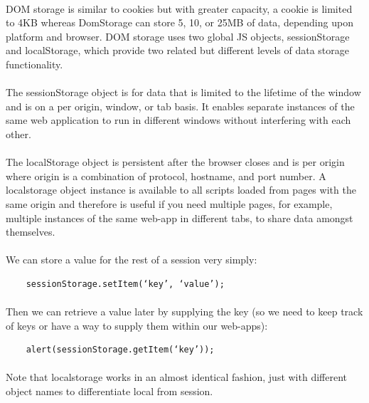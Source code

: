 \paragraph{} DOM storage is similar to cookies but with greater capacity, a cookie is limited to 4KB whereas DomStorage can store  5, 10, or 25MB of data, depending upon platform and browser. DOM storage uses two global JS objects, sessionStorage and localStorage, which provide two related but different levels of data storage functionality.
\paragraph{} The sessionStorage object is for data that is limited to the lifetime of the window and is on a per origin, window, or tab basis. It enables separate instances of the same web application to run in different windows without interfering with each other.
\paragraph{} The localStorage object is persistent after the browser closes and is per origin where origin is a combination of protocol, hostname, and port number. A localstorage object instance is available to all scripts loaded from pages with the same origin and therefore is useful if you need multiple pages, for example, multiple instances of the same web-app in different tabs, to share data amongst themselves.

\paragraph{} We can store a value for the rest of a session very simply:

\begin{lstlisting}
	sessionStorage.setItem(‘key’, ‘value’);
\end{lstlisting}

\paragraph{} Then we can retrieve a value later by supplying the key (so we need to keep track of keys or have a way to supply them within our web-apps):

\begin{lstlisting}
	alert(sessionStorage.getItem(‘key’));
\end{lstlisting}

\paragraph{} Note that localstorage works in an almost identical fashion, just with different object names to differentiate local from session.
